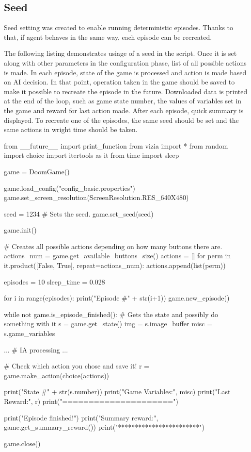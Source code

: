 \subsection {Seed}
Seed setting was created to enable running deterministic episodes. Thanks to that, if agent behaves in the same way, each episode can be recreated.

The following listing demonstrates usiage of a seed in the script. Once it is set along with other parameters in the configuration phase, list of all possible actions is made. In each episode, state of the game is processed and action is made based on AI decision. In that point, operation taken in the game should be saved to make it possible to recreate the episode in the future. Downloaded data is printed at the end of the loop, such as game state number, the values of variables set in the game and reward for last action made. After each episode, quick summary is displayed. To recreate one of the episodes, the same seed should be set and the same actions in wright time should be taken.

\begin{pblock}
from __future__ import print_function
from vizia import *
from random import choice
import itertools as it
from time import sleep

game = DoomGame()

game.load_config("config_basic.properties")
game.set_screen_resolution(ScreenResolution.RES_640X480)

seed = 1234
# Sets the seed.
game.set_seed(seed)

game.init()

# Creates all possible actions depending on how many buttons there are.
actions_num = game.get_available_buttons_size()
actions = []
for perm in it.product([False, True], repeat=actions_num):
    actions.append(list(perm))

episodes = 10
sleep_time = 0.028

for i in range(episodes):
	print("Episode #" + str(i+1))
	game.new_episode()

	while not game.is_episode_finished():
		# Gets the state and possibly do something with it
		s = game.get_state()
		img = s.image_buffer
		misc = s.game_variables

		...
		# IA processing
		...		
		
		# Check which action you chose and save it!
		r = game.make_action(choice(actions))
		
		
		print("State #" + str(s.number))
		print("Game Variables:", misc)
		print("Last Reward:", r)
		print("=====================")

	print("Episode finished!")
	print("Summary reward:", game.get_summary_reward())
	print("************************")


game.close()
\end{pblock}

